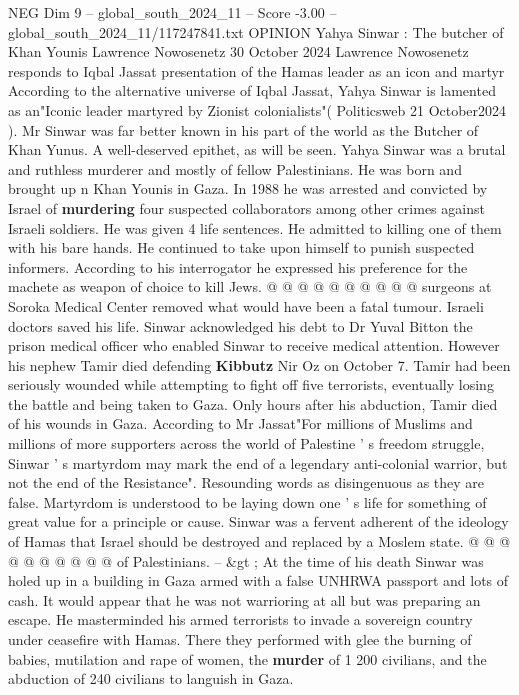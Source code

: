 \begin{textsample}{NEG Dim 9 – global\_south\_2024\_11 – Score -3.00 – global\_south\_2024\_11/117247841.txt}  \label{ex:f9_neg_416}
OPINION Yahya Sinwar : The butcher of Khan Younis Lawrence Nowosenetz 30 October 2024 Lawrence Nowosenetz responds to Iqbal Jassat presentation of the Hamas leader as an icon and martyr According to the alternative universe of Iqbal Jassat, Yahya Sinwar is lamented as an"Iconic leader martyred by Zionist colonialists"( Politicsweb 21 October2024 ).
Mr Sinwar was far better known in his part of the world as the Butcher of Khan Yunus.
A well-deserved epithet, as will be seen.
Yahya Sinwar was a brutal and ruthless murderer and mostly of fellow Palestinians.
He was born and brought up n Khan Younis in Gaza.
In 1988 he was arrested and convicted by Israel of \textbf{murdering} four suspected collaborators among other crimes against Israeli soldiers.
He was given 4 life sentences.
He admitted to killing one of them with his bare hands.
He continued to take upon himself to punish suspected informers.
According to his interrogator he expressed his preference for the machete as weapon of choice to kill Jews. @ @ @ @ @ @ @ @ @ @ surgeons at Soroka Medical Center removed what would have been a fatal tumour.
Israeli doctors saved his life.
Sinwar acknowledged his debt to Dr Yuval Bitton the prison medical officer who enabled Sinwar to receive medical attention.
However his nephew Tamir died defending \textbf{Kibbutz} Nir Oz on October 7.
Tamir had been seriously wounded while attempting to fight off five terrorists, eventually losing the battle and being taken to Gaza.
Only hours after his abduction, Tamir died of his wounds in Gaza.
According to Mr Jassat"For millions of Muslims and millions of more supporters across the world of Palestine ' s freedom struggle, Sinwar ' s martyrdom may mark the end of a legendary anti-colonial warrior, but not the end of the Resistance".
Resounding words as disingenuous as they are false.
Martyrdom is understood to be laying down one ' s life for something of great value for a principle or cause.
Sinwar was a fervent adherent of the ideology of Hamas that Israel should be destroyed and replaced by a Moslem state. @ @ @ @ @ @ @ @ @ @ of Palestinians. -- \&gt ; At the time of his death Sinwar was holed up in a building in Gaza armed with a false UNHRWA passport and lots of cash.
It would appear that he was not warrioring at all but was preparing an escape.
He masterminded his armed terrorists to invade a sovereign country under ceasefire with Hamas.
There they performed with glee the burning of babies, mutilation and rape of women, the \textbf{murder} of 1 200 civilians, and the abduction of 240 civilians to languish in Gaza.

\end{textsample}
